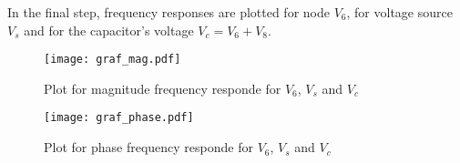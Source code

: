 In the final step, frequency responses are plotted for node $V_6$, for voltage source $V_s$ and for the capacitor's voltage $V_c=V_6+V_8$. 
\begin{figure}[h] \centering
\texttt{[image: graf\_mag.pdf]}
\caption{Plot for magnitude frequency responde for $V_6$, $V_s$ and $V_c$}
\end{figure}
\begin{figure}[h] \centering
\texttt{[image: graf\_phase.pdf]}
\caption{Plot for phase frequency responde for $V_6$, $V_s$ and $V_c$}
\end{figure}
